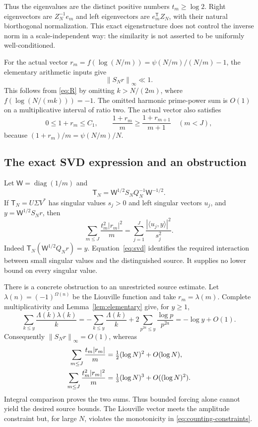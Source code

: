 \documentclass[11pt,letterpaper]{article}
\numberwithin{equation}{section}
\theoremstyle{definition}
\theoremstyle{remark}
\newcommand{\norm}[1]{\left\lVert#1\right\rVert}
\DeclareMathOperator{\diag}{diag}
\begin{document}
Thus the eigenvalues are the distinct positive numbers $t_m\ge\log2$.
Right eigenvectors are $Z_N^{-1}e_m$ and left eigenvectors are
$e_m^{\mathsf T}Z_N$, with their natural biorthogonal normalization.
This exact eigenstructure does not control the inverse norm in a
scale-independent way: the similarity is not asserted to be uniformly
well-conditioned.

For the actual vector
$r_m=f(\log(N/m))=\psi(N/m)/(N/m)-1$, the elementary arithmetic inputs give
\begin{equation}\label{eq:finite-forcing}
 \norm{S_Nr}_\infty\ll1.
\end{equation}
This follows from \eqref{eq:R} by omitting $k>N/(2m)$, where
$f(\log(N/(mk)))=-1$. The omitted harmonic prime-power sum is $O(1)$
on a multiplicative interval of ratio two. The actual vector also satisfies
\begin{equation}\label{eq:counting-constraints}
 0\le1+r_m\le C_1,\qquad
 \frac{1+r_m}{m}\ge\frac{1+r_{m+1}}{m+1}\quad(m<J),
\end{equation}
because $(1+r_m)/m=\psi(N/m)/N$.

\subsection{The exact SVD expression and an obstruction}
Let $\mathsf W=\diag(1/m)$ and
\[
 \mathsf T_N=\mathsf W^{1/2}S_NQ_N^{-1}\mathsf W^{-1/2}.
\]
If $\mathsf T_N=U\Sigma V^*$ has singular values $s_j>0$ and left
singular vectors $u_j$, and $y=\mathsf W^{1/2}S_Nr$, then
\begin{equation}\label{eq:svd}
 \sum_{m\le J}\frac{t_m^2|r_m|^2}{m}
   =\sum_{j=1}^J\frac{|\langle u_j,y\rangle|^2}{s_j^2}.
\end{equation}
Indeed $\mathsf T_N(\mathsf W^{1/2}Q_Nr)=y$.
Equation~\eqref{eq:svd} identifies the required interaction between small
singular values and the distinguished source. It supplies no lower bound
on every singular value.

There is a concrete obstruction to an unrestricted source estimate.
Let $\lambda(n)=(-1)^{\Omega(n)}$ be the Liouville function and take
$r_m=\lambda(m)$. Complete multiplicativity and
Lemma~\ref{lem:elementary} give, for $y\ge1$,
\[
 \sum_{k\le y}\frac{\Lambda(k)\lambda(k)}k
 =-\sum_{k\le y}\frac{\Lambda(k)}k
       +2\sum_{p^{2a}\le y}\frac{\log p}{p^{2a}}
 =-\log y+O(1).
\]
Consequently $\norm{S_Nr}_\infty=O(1)$, whereas
\begin{align}
 \sum_{m\le J}\frac{t_m|r_m|}{m}
 &=\tfrac12(\log N)^2+O(\log N),\label{eq:liouville-obstruction}\\
 \sum_{m\le J}\frac{t_m^2|r_m|^2}{m}
 &=\tfrac13(\log N)^3+O((\log N)^2).\notag
\end{align}
Integral comparison proves the two sums.
Thus bounded forcing alone cannot yield the desired source bounds.
The Liouville vector meets the amplitude constraint but, for large $N$,
violates the monotonicity in \eqref{eq:counting-constraints}.
\end{document}
